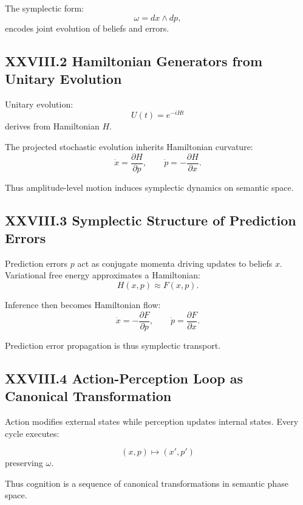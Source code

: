 \documentclass[12pt,letterpaper]{article}
\begin{document}
The symplectic form:
\[
\omega = dx \wedge dp,
\]
encodes joint evolution of beliefs and errors.

\subsection{XXVIII.2 Hamiltonian Generators from Unitary Evolution}

Unitary evolution:
\[
U(t) = e^{-iHt}
\]
derives from Hamiltonian $H$.

The projected stochastic evolution inherits Hamiltonian curvature:
\[
\dot{x} = \frac{\partial H}{\partial p}, \qquad
\dot{p} = -\frac{\partial H}{\partial x}.
\]

Thus amplitude-level motion induces symplectic dynamics on semantic space.

\subsection{XXVIII.3 Symplectic Structure of Prediction Errors}

Prediction errors $p$ act as conjugate momenta driving updates to beliefs $x$.  
Variational free energy approximates a Hamiltonian:
\[
H(x,p) \approx F(x,p).
\]

Inference then becomes Hamiltonian flow:
\[
\dot{x} = -\frac{\partial F}{\partial p}, \qquad
\dot{p} = \frac{\partial F}{\partial x}.
\]

Prediction error propagation is thus symplectic transport.

\subsection{XXVIII.4 Action-Perception Loop as Canonical Transformation}

Action modifies external states while perception updates internal states.  
Every cycle executes:

\[
(x,p) \mapsto (x',p')
\]
preserving $\omega$.

Thus cognition is a sequence of canonical transformations in semantic phase space.

\end{document}
